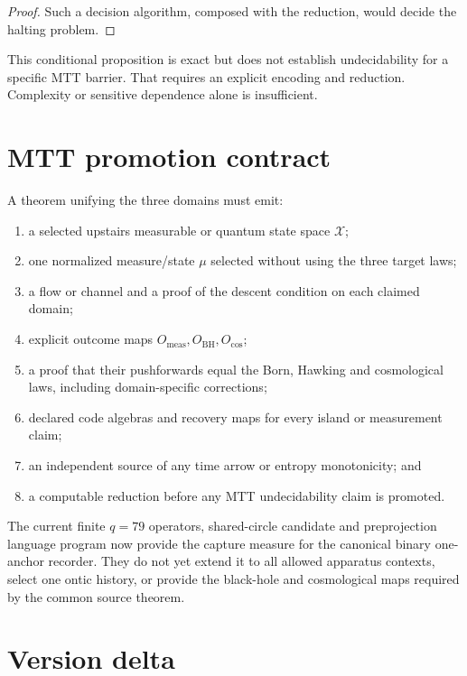 \documentclass[11pt]{article}
\newcommand{\cX}{\mathcal X}
\begin{document}
\begin{proof}
Such a decision algorithm, composed with the reduction, would decide the halting
problem.
\end{proof}

This conditional proposition is exact but does not establish undecidability for a
specific MTT barrier. That requires an explicit encoding and reduction. Complexity
or sensitive dependence alone is insufficient.

\section{MTT promotion contract}

A theorem unifying the three domains must emit:
\begin{enumerate}
\item a selected upstairs measurable or quantum state space $\cX$;
\item one normalized measure/state $\mu$ selected without using the three target laws;
\item a flow or channel and a proof of the descent condition on each claimed domain;
\item explicit outcome maps $O_{\mathrm{meas}},O_{\mathrm{BH}},O_{\mathrm{cos}}$;
\item a proof that their pushforwards equal the Born, Hawking and cosmological laws,
including domain-specific corrections;
\item declared code algebras and recovery maps for every island or measurement claim;
\item an independent source of any time arrow or entropy monotonicity; and
\item a computable reduction before any MTT undecidability claim is promoted.
\end{enumerate}

The current finite $q=79$ operators, shared-circle candidate and preprojection
language program now provide the capture measure for the canonical binary one-anchor
recorder. They do not yet extend it to all allowed apparatus contexts, select one
ontic history, or provide the black-hole and cosmological maps required by the common
source theorem.

\section{Version delta}
\end{document}
